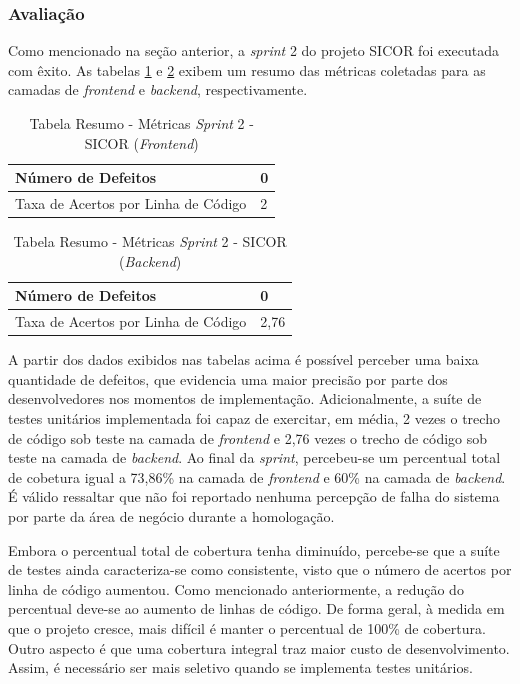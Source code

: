 \subsubsection{Avaliação}

Como mencionado na seção anterior, a \textit{sprint} 2 do projeto SICOR foi executada com êxito. As tabelas \ref{table:tabela14} e \ref{table:tabela15} exibem um resumo das métricas coletadas para as camadas de \textit{frontend} e \textit{backend}, respectivamente.

\begin{table}[h]
\caption{Tabela Resumo - Métricas \textit{Sprint} 2 - SICOR (\textit{Frontend})}
\centering
\begin{tabular}{ | m{8cm} | m{8cm} | } 
\hline
Número de Defeitos & 0 \\ 
\hline
Taxa de Acertos por Linha de Código & 2 \\ 
\hline
\end{tabular}
\label{table:tabela14}
\end{table}

\begin{table}[h]
\caption{Tabela Resumo - Métricas \textit{Sprint} 2 - SICOR (\textit{Backend})}
\centering
\begin{tabular}{ | m{8cm} | m{8cm} | } 
\hline
Número de Defeitos & 0 \\ 
\hline
Taxa de Acertos por Linha de Código & 2,76 \\ 
\hline
\end{tabular}
\label{table:tabela15}
\end{table}

A partir dos dados exibidos nas tabelas acima é possível perceber uma baixa quantidade de defeitos, que evidencia uma maior precisão por parte dos desenvolvedores nos momentos de implementação. Adicionalmente, a suíte de testes unitários implementada foi capaz de exercitar, em média, 2 vezes o trecho de código sob teste na camada de \textit{frontend} e 2,76 vezes o trecho de código sob teste na camada de \textit{backend}. Ao final da \textit{sprint}, percebeu-se um percentual total de cobetura igual a 73,86\% na camada de \textit{frontend} e 60\% na camada de \textit{backend}. É válido ressaltar que não foi reportado nenhuma percepção de falha do sistema por parte da área de negócio durante a homologação.

Embora o percentual total de cobertura tenha diminuído, percebe-se que a suíte de testes ainda caracteriza-se como consistente, visto que o número de acertos por linha de código aumentou. Como mencionado anteriormente, a redução do percentual deve-se ao aumento de linhas de código. De forma geral, à medida em que o projeto cresce, mais difícil é manter o percentual de 100\% de cobertura. Outro aspecto é que uma cobertura integral traz maior custo de desenvolvimento. Assim, é necessário ser mais seletivo quando se implementa testes unitários.


